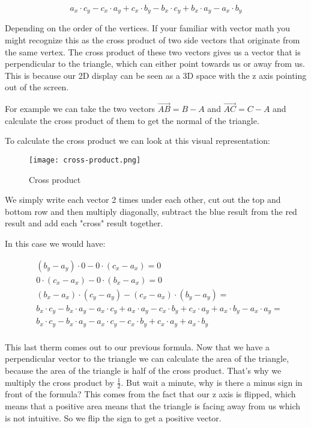 \documentclass[12pt]{report} \usepackage{preamble}
\begin{document}
\[a_x \cdot c_y - c_x \cdot a_y + c_x \cdot b_y - b_x \cdot c_y + b_x \cdot a_y - a_x \cdot b_y\]

Depending on the order of the vertices. If your familiar with vector math you might
recognize this as the cross product of two side vectors that originate from the same vertex.
The cross product of these two vectors gives us a vector that is perpendicular to the triangle,
which can either point towards us or away from us.
This is because our 2D display can be seen as a 3D space with the z axis pointing out of the screen.

For example we can take the two vectors \(\vec{AB} = B - A\) and \(\vec{AC} = C - A\)
and calculate the cross product of them to get the normal of the triangle.

To calculate the cross product we can look at this visual representation:

\begin{figure}[hbtp]
	\centering
	\texttt{[image: cross-product.png]}
	\caption{Cross product} \floatbarrier
\end{figure}

We simply write each vector 2 times under each other, cut out the top and bottom row
and then multiply diagonally, subtract the blue result from the red result
and add each "cross" result together.

In this case we would have:

\[
	\begin{aligned}
		 & (b_y - a_y) \cdot 0 - 0 \cdot (c_x - a_x) = 0                                                                                    \\
		 & 0 \cdot (c_x - a_x) - 0 \cdot (b_x - a_x) = 0                                                                                    \\
		 & (b_x - a_x) \cdot (c_y - a_y) - (c_x - a_x) \cdot (b_y - a_y) =                                                                  \\
		 & b_x \cdot c_y - b_x \cdot a_y - a_x \cdot c_y + a_x \cdot a_y - c_x \cdot b_y + c_x \cdot a_y + a_x \cdot b_y - a_x \cdot a_y  = \\
		 & b_x \cdot c_y - b_x \cdot a_y - a_x \cdot c_y - c_x \cdot b_y + c_x \cdot a_y + a_x \cdot b_y                                    \\
	\end{aligned}
\]

This last therm comes out to our previous formula.
Now that we have a perpendicular vector to the triangle we can calculate the area of the triangle,
because the area of the triangle is half of the cross product.
That's why we multiply the cross product by \(\frac{1}{2}\).
But wait a minute, why is there a minus sign in front of the formula?
This comes from the fact that our z axis is flipped, which means that a positive area
means that the triangle is facing away from us which is not
intuitive. So we flip the sign to get a positive vector.
\end{document}
